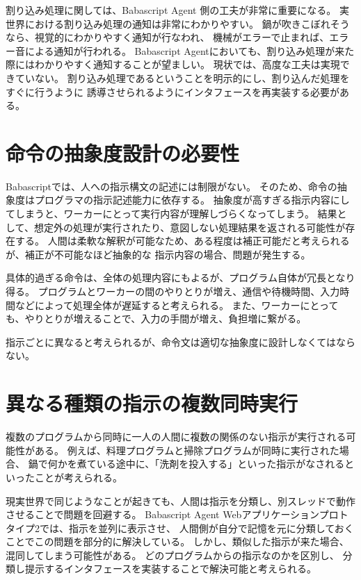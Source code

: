 割り込み処理に関しては、Babascript Agent 側の工夫が非常に重要になる。
実世界における割り込み処理の通知は非常にわかりやすい。
鍋が吹きこぼれそうなら、視覚的にわかりやすく通知が行なわれ、
機械がエラーで止まれば、エラー音による通知が行われる。 Babascript
Agentにおいても、割り込み処理が来た際にはわかりやすく通知することが望ましい。
現状では、高度な工夫は実現できていない。
割り込み処理であるということを明示的にし、割り込んだ処理をすぐに行うように
誘導させられるようにインタフェースを再実装する必要がある。

\section{命令の抽象度設計の必要性}\label{ux547dux4ee4ux306eux62bdux8c61ux5ea6ux8a2dux8a08ux306eux5fc5ux8981ux6027}

Babascriptでは、人への指示構文の記述には制限がない。
そのため、命令の抽象度はプログラマの指示記述能力に依存する。
抽象度が高すぎる指示内容にしてしまうと、ワーカーにとって実行内容が理解しづらくなってしまう。
結果として、想定外の処理が実行されたり、意図しない処理結果を返される可能性が存在する。
人間は柔軟な解釈が可能なため、ある程度は補正可能だと考えられるが、補正が不可能なほど抽象的な
指示内容の場合、問題が発生する。

具体的過ぎる命令は、全体の処理内容にもよるが、プログラム自体が冗長となり得る。
プログラムとワーカーの間のやりとりが増え、通信や待機時間、入力時間などによって処理全体が遅延すると考えられる。
また、ワーカーにとっても、やりとりが増えることで、入力の手間が増え、負担増に繋がる。

指示ごとに異なると考えられるが、命令文は適切な抽象度に設計しなくてはならない。

\section{異なる種類の指示の複数同時実行}\label{ux7570ux306aux308bux7a2eux985eux306eux6307ux793aux306eux8907ux6570ux540cux6642ux5b9fux884c}

複数のプログラムから同時に一人の人間に複数の関係のない指示が実行される可能性がある。
例えば、料理プログラムと掃除プログラムが同時に実行された場合、
鍋で何かを煮ている途中に、「洗剤を投入する」といった指示がなされるといったことが考えられる。

現実世界で同じようなことが起きても、人間は指示を分類し、別スレッドで動作させることで問題を回避する。
Babascript Agent
Webアプリケーションプロトタイプ2では、指示を並列に表示させ、
人間側が自分で記憶を元に分類しておくことでこの問題を部分的に解決している。
しかし、類似した指示が来た場合、混同してしまう可能性がある。
どのプログラムからの指示なのかを区別し、
分類し提示するインタフェースを実装することで解決可能と考えられる。


